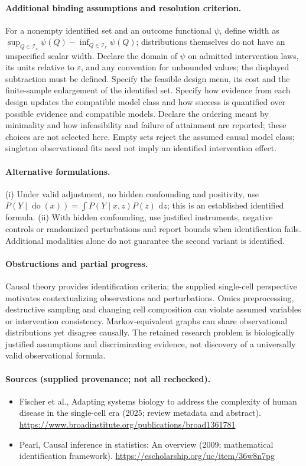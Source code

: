 \documentclass[11pt]{article}
\begin{document}
\paragraph{Additional binding assumptions and resolution criterion.} For a nonempty identified set and an outcome functional $\psi$, define width as $\sup_{Q\in\mathcal I_x}\psi(Q)-\inf_{Q\in\mathcal I_x}\psi(Q)$; distributions themselves do not have an unspecified scalar width. Declare the domain of $\psi$ on admitted intervention laws, its units relative to $\varepsilon$, and any convention for unbounded values; the displayed subtraction must be defined. Specify the feasible design menu, its cost and the finite-sample enlargement of the identified set. Specify how evidence from each design updates the compatible model class and how success is quantified over possible evidence and compatible models. Declare the ordering meant by minimality and how infeasibility and failure of attainment are reported; these choices are not selected here. Empty sets reject the assumed causal model class; singleton observational fits need not imply an identified intervention effect.

\paragraph{Alternative formulations.} (i) Under valid adjustment, no hidden confounding and positivity, use $P(Y\mid\operatorname{do}(x))=\int P(Y\mid x,z)P(z)\,\,\mathrm{d} z$; this is an established identified formula. (ii) With hidden confounding, use justified instruments, negative controls or randomized perturbations and report bounds when identification fails. Additional modalities alone do not guarantee the second variant is identified.
\paragraph{Obstructions and partial progress.} Causal theory provides identification criteria; the supplied single-cell perspective motivates contextualizing observations and perturbations. Omics preprocessing, destructive sampling and changing cell composition can violate assumed variables or intervention consistency. Markov-equivalent graphs can share observational distributions yet disagree causally. The retained research problem is biologically justified assumptions and discriminating evidence, not discovery of a universally valid observational formula.
\paragraph{Sources (supplied provenance; not all rechecked).}
\begin{itemize}
\item Fischer et al., Adapting systems biology to address the complexity of human disease in the single-cell era (2025; review metadata and abstract). \url{https://www.broadinstitute.org/publications/broad1361781}
\item Pearl, Causal inference in statistics: An overview (2009; mathematical identification framework). \url{https://escholarship.org/uc/item/36w8n7pg}
\end{itemize}
\end{document}
